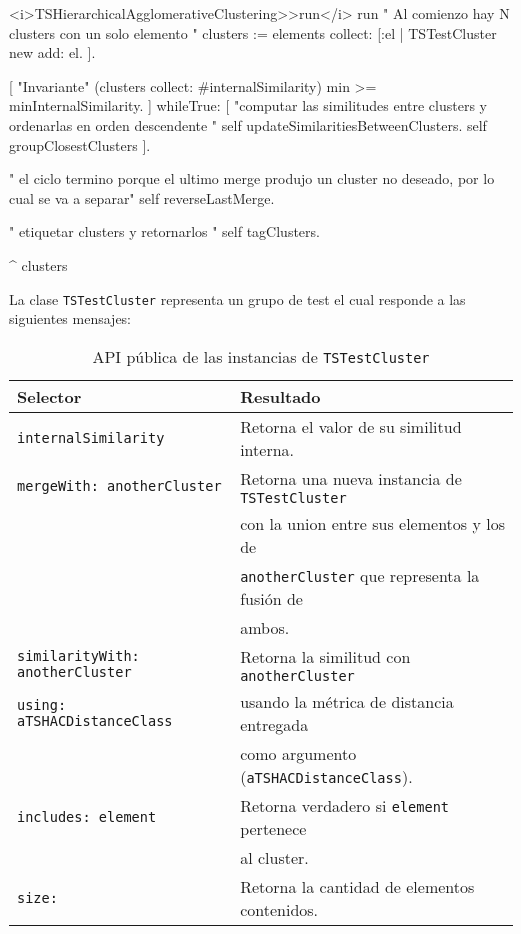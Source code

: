 \begin{codeWithLineNumbers}
<i>TSHierarchicalAgglomerativeClustering>>run</i>
run
	" Al comienzo hay N clusters con un solo elemento "
	clusters := elements collect: [:el | TSTestCluster new add: el. ].
	
	[
		"Invariante"
		(clusters collect: #internalSimilarity) min >= minInternalSimilarity.
	] 
		whileTrue: [ 
			"computar las similitudes entre clusters y ordenarlas en orden descendente "
			self updateSimilaritiesBetweenClusters.
			self groupClosestClusters
	].
		
	" el ciclo termino porque el ultimo merge produjo un cluster no deseado, por lo cual se va a separar"
	self reverseLastMerge. 
	
	" etiquetar clusters y retornarlos "
	self tagClusters.
	
	^ clusters
\end{codeWithLineNumbers}

\clearpage
\par La clase {\tt TSTestCluster} representa un grupo de test el cual responde a las siguientes mensajes: 

\begin{table}[h] 
    \centering 
    \begin{tabular}{|l|l|}
    	\hline
\textbf{Selector} & \textbf{Resultado} \\ \hline \hline

{\tt internalSimilarity } & Retorna el valor de su similitud interna.\\ \hline
{\tt mergeWith: anotherCluster} & Retorna una nueva instancia de {\tt TSTestCluster} \\ 
						& con la union entre sus elementos y los de  \\ 
						& {\tt anotherCluster} que representa la fusión de \\
						& ambos. \\ \hline
{\tt similarityWith: anotherCluster}	& Retorna la similitud con {\tt anotherCluster} \\ 
{\tt using: aTSHACDistanceClass } &  usando la métrica de distancia entregada  \\
						& como argumento ({\tt aTSHACDistanceClass}).\\ \hline
{\tt includes: element} & Retorna verdadero si {\tt element} pertenece \\
						&  al cluster.\\ \hline
{\tt size:} & Retorna la cantidad de elementos contenidos. \\ \hline		
				
    \end{tabular}
    \caption{API pública de las instancias de {\tt TSTestCluster}}
\end{table}  

